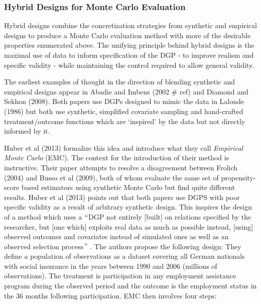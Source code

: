 \documentclass[../main.tex]{subfiles}
\begin{document}
\subsubsection{Hybrid Designs for Monte Carlo Evaluation}

Hybrid designs combine the concretization strategies from synthetic and empirical designs to produce a Monte Carlo evaluation method with more of the desirable properties enumerated above. The unifying principle behind hybrid designs is the maximal use of data to inform specification of the DGP - to improve realism and specific validity - while maintaining the control required to allow general validity.\par


\vspace{\baselineskip}
The earliest examples of thought in the direction of blending synthetic and empirical designs appear in Abadie and Imbens (2002 $\#$ ref) and Diamond and Sekhon (2008). Both papers use DGPs designed to mimic the data in Lalonde (1986) but both use synthetic, simplified covariate sampling and hand-crafted treatment/outcome functions which are ‘inspired’ by the data but not directly informed by it.\par


\vspace{\baselineskip}
Huber et al (2013) formalize this idea and introduce what they call \textit{Empirical Monte Carlo }(EMC). The context for the introduction of their method is instructive. Their paper attempts to resolve a disagreement between Frolich (2004) and Busso et al (2009), both of whom evaluate the same set of propensity-score based estimators using synthetic Monte Carlo but find quite different results. Huber et al (2013) points out that both papers use DGPS with poor specific validity as a result of arbitrary synthetic design. This inspires the design of a method which uses a $``$DGP not entirely [built] on relations specified by the researcher, but [one which] exploits real data as much as possible instead, [using] observed outcomes and covariates instead of simulated ones as well as an observed selection process$"$ . The authors propose the following design: They define a population of observations as a dataset covering all German nationals with social insurance in the years between 1990 and 2006 (millions of observations). The treatment is participation in any employment assistance program during the observed period and the outcome is the employment status in the 36 months following participation. EMC then involves four steps: \par
\end{document}
